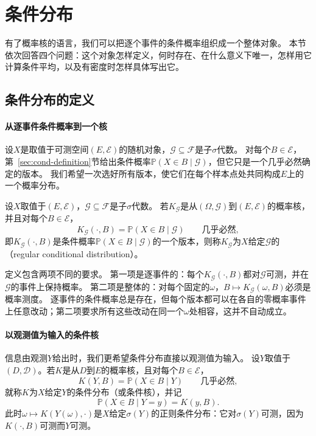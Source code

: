 \section{条件分布}
\label{sec:cond-distributions}

有了概率核的语言，我们可以把逐个事件的条件概率组织成一个整体对象。
本节依次回答四个问题：这个对象怎样定义，何时存在、在什么意义下唯一，怎样用它计算条件平均，以及有密度时怎样具体写出它。

\subsection{条件分布的定义}

\paragraph{从逐事件条件概率到一个核}
设$X$是取值于可测空间$(E,\mathcal E)$的随机对象，$\mathcal G\subseteq\mathcal F$是子$\sigma$代数。
对每个$B\in\mathcal E$，第~\ref{sec:cond-definition}节给出条件概率$\mathbb P(X\in B\mid\mathcal G)$，但它只是一个几乎必然确定的版本。
我们希望一次选好所有版本，使它们在每个样本点处共同构成$E$上的一个概率分布。

\begin{definition}[正则条件分布]
\label{def:cond-regular-distribution}
设$X$取值于$(E,\mathcal E)$，$\mathcal G\subseteq\mathcal F$是子$\sigma$代数。
若$K_{\mathcal G}$是从$(\Omega,\mathcal G)$到$(E,\mathcal E)$的概率核，并且对每个$B\in\mathcal E$，
\[
  K_{\mathcal G}(\cdot,B)=\mathbb P(X\in B\mid\mathcal G)\qquad\text{几乎必然},
\]
即$K_{\mathcal G}(\cdot,B)$是条件概率$\mathbb P(X\in B\mid\mathcal G)$的一个版本，则称$K_{\mathcal G}$为$X$给定$\mathcal G$的（regular conditional distribution）。
\end{definition}

定义包含两项不同的要求。
第一项是逐事件的：每个$K_{\mathcal G}(\cdot,B)$都对$\mathcal G$可测，并在$\mathcal G$的事件上保持概率。
第二项是整体的：对每个固定的$\omega$，$B\mapsto K_{\mathcal G}(\omega,B)$必须是概率测度。
逐事件的条件概率总是存在，但每个版本都可以在各自的零概率事件上任意改动；第二项要求所有这些改动在同一个$\omega$处相容，这并不自动成立。

\paragraph{以观测值为输入的条件核}
信息由观测$Y$给出时，我们更希望条件分布直接以观测值为输入。
设$Y$取值于$(D,\mathcal D)$。若$K$是从$D$到$E$的概率核，且对每个$B\in\mathcal E$，
\[
  K(Y,B)=\mathbb P(X\in B\mid Y)\qquad\text{几乎必然},
\]
就称$K$为$X$给定$Y$的条件分布（或条件核），并记
\[
  \mathbb P(X\in B\mid Y=y)=K(y,B).
\]
此时$\omega\mapsto K(Y(\omega),\cdot)$是$X$给定$\sigma(Y)$的正则条件分布：它对$\sigma(Y)$可测，因为$K(\cdot,B)$可测而$Y$可测。

